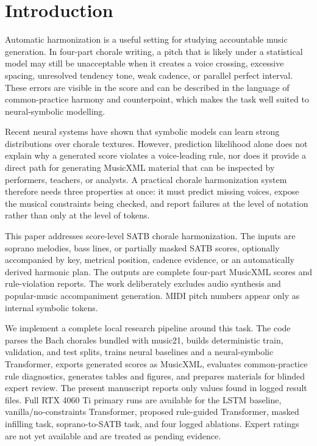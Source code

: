 \section{Introduction}

Automatic harmonization is a useful setting for studying accountable music generation. In four-part chorale writing, a pitch that is likely under a statistical model may still be unacceptable when it creates a voice crossing, excessive spacing, unresolved tendency tone, weak cadence, or parallel perfect interval. These errors are visible in the score and can be described in the language of common-practice harmony and counterpoint, which makes the task well suited to neural-symbolic modelling.

Recent neural systems have shown that symbolic models can learn strong distributions over chorale textures. However, prediction likelihood alone does not explain why a generated score violates a voice-leading rule, nor does it provide a direct path for generating MusicXML material that can be inspected by performers, teachers, or analysts. A practical chorale harmonization system therefore needs three properties at once: it must predict missing voices, expose the musical constraints being checked, and report failures at the level of notation rather than only at the level of tokens.

This paper addresses score-level SATB chorale harmonization. The inputs are soprano melodies, bass lines, or partially masked SATB scores, optionally accompanied by key, metrical position, cadence evidence, or an automatically derived harmonic plan. The outputs are complete four-part MusicXML scores and rule-violation reports. The work deliberately excludes audio synthesis and popular-music accompaniment generation. MIDI pitch numbers appear only as internal symbolic tokens.

We implement a complete local research pipeline around this task. The code parses the Bach chorales bundled with music21, builds deterministic train, validation, and test splits, trains neural baselines and a neural-symbolic Transformer, exports generated scores as MusicXML, evaluates common-practice rule diagnostics, generates tables and figures, and prepares materials for blinded expert review. The present manuscript reports only values found in logged result files. Full RTX 4060 Ti primary runs are available for the LSTM baseline, vanilla/no-constraints Transformer, proposed rule-guided Transformer, masked infilling task, soprano-to-SATB task, and four logged ablations. Expert ratings are not yet available and are treated as pending evidence.
